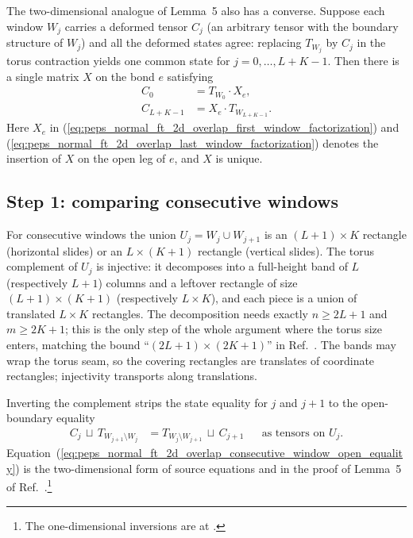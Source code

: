 \documentclass{article}
\begin{document}
The two-dimensional analogue of Lemma~5 also has a converse. Suppose each
window $W_j$ carries a deformed tensor $C_j$ (an arbitrary tensor with
the boundary structure of $W_j$) and all the deformed states agree:
replacing $T_{W_j}$ by $C_j$ in the torus contraction yields one common
state for $j = 0, \dots, L+K-1$. Then there is a single matrix $X$ on the bond $e$ satisfying
\begin{align}
    C_0
     & = T_{W_0} \cdot X_e,
    \label{eq:peps_normal_ft_2d_overlap_first_window_factorization} \\
    C_{L+K-1}
     & = X_e \cdot T_{W_{L+K-1}}.
    \label{eq:peps_normal_ft_2d_overlap_last_window_factorization}
\end{align}
Here $X_e$ in (\ref{eq:peps_normal_ft_2d_overlap_first_window_factorization})
and (\ref{eq:peps_normal_ft_2d_overlap_last_window_factorization}) denotes
the insertion of $X$ on the open leg of $e$, and
$X$ is unique.

\subsection{Step 1: comparing consecutive windows}

For consecutive windows the union $U_j = W_j \cup W_{j+1}$ is an
$(L+1) \times K$ rectangle (horizontal slides) or an $L \times (K+1)$
rectangle (vertical slides). The torus complement of $U_j$ is injective:
it decomposes into a full-height band of $L$ (respectively $L+1$)
columns and a leftover rectangle of size $(L+1)\times(K+1)$
(respectively $L \times K$), and each piece is a union of translated
$L \times K$ rectangles. The decomposition needs exactly $n \geq 2L+1$
and $m \geq 2K+1$; this is the only step of the whole argument where
the torus size enters, matching the bound
``$(2L+1)\times(2K+1)$'' in Ref.~\cite{Molnar2018NormalPEPS}. The bands may wrap the torus seam, so the
covering rectangles are translates of coordinate rectangles;
injectivity transports along translations.

Inverting the complement strips the state equality for $j$ and $j+1$ to
the open-boundary equality
\begin{align}
    C_j \,\sqcup\, T_{W_{j+1} \setminus W_j}
     & = T_{W_j \setminus W_{j+1}} \,\sqcup\, C_{j+1}
     &                                                & \text{as tensors on } U_j.
    \label{eq:peps_normal_ft_2d_overlap_consecutive_window_open_equality}
\end{align}
Equation~(\ref{eq:peps_normal_ft_2d_overlap_consecutive_window_open_equality})
is the two-dimensional form of source equations  and
 in the proof of Lemma~5 of
Ref.~\cite{Molnar2018NormalPEPS}.\footnote{The one-dimensional inversions
    are at .}
\end{document}
